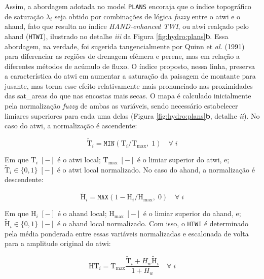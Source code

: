 \documentclass[./main.tex]{subfiles}
\begin{document}
\par Assim, a abordagem adotada no \gls{model} \texttt{PLANS} encoraja que o índice topográfico de saturação $\lambda_i$ seja obtido por combinações de lógica \textit{fuzzy} entre o \acrshort{atwi} e o \acrshort{ahand}, fato que resulta no índice \textit{HAND-enhanced TWI}, ou \acrshort{atwi} realçado pelo \acrshort{ahand} (\texttt{HTWI}), ilustrado no detalhe \textit{iii} da Figura \ref{fig:hydro:plans}\textbf{b}. Essa abordagem, na verdade, foi sugerida tangencialmente por Quinn et \textit{al.} (1991) \cite{Quinn1991b} para diferenciar as regiões de drenagem efêmera e perene, mas em relação a diferentes métodos de acúmulo de fluxo. O índice proposto, nessa linha, preserva a característica do \acrshort{atwi} em aumentar a saturação da paisagem de montante para jusante, mas torna esse efeito relativamente mais pronunciado nas proximidades das \gls{sat_areas} do que nas encostas mais secas. O mapa é calculado inicialmente pela normalização \textit{fuzzy} de ambas as variáveis, sendo necessário estabelecer limiares superiores para cada uma delas (Figura \ref{fig:hydro:plans}\textbf{b}, detalhe \textit{ii}). No caso do \acrshort{atwi}, a normalização é ascendente: 
\begin{linenomath*}
\begin{equation}
\label{eq:plans:ftwi}
\tilde{\text{T}}_i = \texttt{MIN}(\text{T}_i/\text{T}_\text{max},\; 1) \quad \forall \; i
\end{equation}
\end{linenomath*}
Em que  $\text{T}_i\;[-]$ é o \acrshort{atwi} local; $\text{T}_\text{max}\;[-]$ é o limiar superior do \acrshort{atwi}, e; $\tilde{\text{T}}_i\in \{0,1\}\;[-]$ é o \acrshort{atwi} local normalizado. No caso do \acrshort{ahand}, a normalização é descendente:
\begin{linenomath*}
\begin{equation}
\label{eq:plans:ftwi}
\tilde{\text{H}}_i = \texttt{MAX}(1 - \text{H}_i/\text{H}_\text{max},\; 0) \quad \forall \; i
\end{equation}
\end{linenomath*}
Em que  $\text{H}_i\;[-]$ é o \acrshort{ahand} local; $\text{H}_\text{max}\;[-]$ é o limiar superior do \acrshort{ahand}, e; $\tilde{\text{H}}_i\in \{0,1\}\;[-]$ é o \acrshort{ahand} local normalizado. Com isso, o \texttt{HTWI} é determinado pela média ponderada entre essas variáveis normalizadas e escalonada de volta para a amplitude original do \acrshort{atwi}:
\begin{linenomath*}
\begin{equation}
\label{eq:plans:htwi}
\text{HT}_{i} = \text{T}_\text{max} \frac{\tilde{\text{T}}_i + H_w \tilde{\text{H}}_i}{1 + H_w} \quad \forall \; i
\end{equation}
\end{linenomath*}
\end{document}
